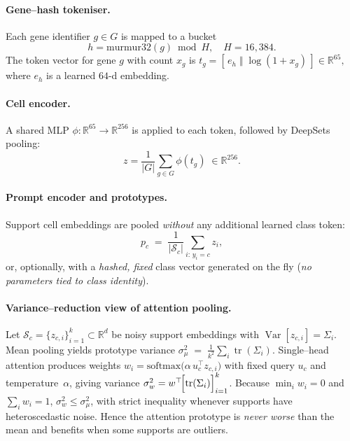 \documentclass{article}
\begin{document}
\paragraph{Gene–hash tokeniser.}
Each gene identifier \(g\in G\) is mapped to a bucket
\begin{equation}
	h = \mathrm{murmur32}(g)\!\bmod\! H,\quad H=16{,}384.
\end{equation}
The token vector for gene \(g\) with count \(x_g\) is
\(
t_g = [\,e_h \;\Vert\; \log(1+x_g)\,]\in\mathbb{R}^{65},
\)
where \(e_h\) is a learned \(64\)-d embedding.

\paragraph{Cell encoder.}
A shared MLP \(\phi:\mathbb{R}^{65}\!\to\!\mathbb{R}^{256}\) is applied to each token, followed by DeepSets pooling:
\begin{equation}
	z = \frac{1}{|G|}\sum_{g\in G}\phi(t_g)\;\in\mathbb{R}^{256}.
\end{equation}

\paragraph{Prompt encoder and prototypes.}
Support cell embeddings are pooled \emph{without} any additional learned class token:
\[
p_{c} \;=\; \frac{1}{|\mathcal{S}_{c}|}\sum_{i:\,y_i=c} z_i,
\]
or, optionally, with a \textit{hashed, fixed} class vector generated on the fly
(\emph{no parameters tied to class identity}).

\paragraph{Variance–reduction view of attention pooling.}
Let $\mathcal S_c=\{z_{c,i}\}_{i=1}^{k}\subset\mathbb R^{d}$ be noisy support
embeddings with $\operatorname{Var}[z_{c,i}]=\Sigma_i$.
Mean pooling yields prototype variance
$\sigma_\mu^{2}\;=\;\tfrac{1}{k^{2}}\sum_{i}\operatorname{tr}(\Sigma_i)$.
Single–head attention produces weights
$
w_i=\mathrm{softmax}\bigl(\alpha\,u_c^{\top}z_{c,i}\bigr)
$
with fixed query $u_c$ and temperature~$\alpha$,
giving variance
$\sigma_{w}^{2}=w^{\top}\!\Bigl[\operatorname{tr}(\Sigma_i)\Bigr]_{i=1}^{k}$.
Because $\min_i w_i\!=\!0$ and $\sum_i w_i\!=\!1$,
$\sigma_{w}^{2}\le \sigma_\mu^{2}$, with strict
inequality whenever supports have heteroscedastic noise.
Hence the attention prototype is \emph{never worse} than the mean and
benefits when some supports are outliers.
\end{document}
